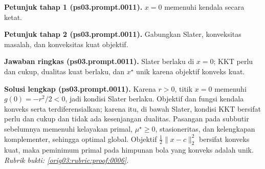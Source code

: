 \par\noindent\textbf{Petunjuk tahap 1 (ps03.prompt.0011).}
$x=0$ memenuhi kendala secara ketat.
\label{orig03:ps03:hint1:0011}
\par\noindent\textbf{Petunjuk tahap 2 (ps03.prompt.0011).}
Gabungkan Slater, konveksitas masalah, dan konveksitas kuat objektif.
\label{orig03:ps03:hint2:0011}
\par\noindent\textbf{Jawaban ringkas (ps03.prompt.0011).}
Slater berlaku di $x=0$; KKT perlu dan cukup, dualitas kuat berlaku, dan
$x^\star$ unik karena objektif konveks kuat.
\label{orig03:ps03:answer:0011}
\par\noindent\textbf{Solusi lengkap (ps03.prompt.0011).}
Karena $r>0$, titik $x=0$ memenuhi
$g(0)=-r^2/2<0$, jadi kondisi Slater berlaku. Objektif dan fungsi kendala
konveks serta terdiferensialkan; karena itu, di bawah Slater, kondisi KKT
bersifat perlu dan cukup dan tidak ada kesenjangan dualitas. Pasangan pada
subbutir sebelumnya memenuhi kelayakan primal, $\mu^\star\geq0$,
stasioneritas, dan kelengkapan komplementer, sehingga optimal global.
Objektif $\tfrac12\lVert x-c\rVert_2^2$ bersifat konveks kuat, maka
peminimum primal pada himpunan bola yang konveks adalah unik.
\emph{Rubrik bukti: \ref{orig03:rubric:proof:0006}.}
\label{orig03:ps03:solution:0011}
